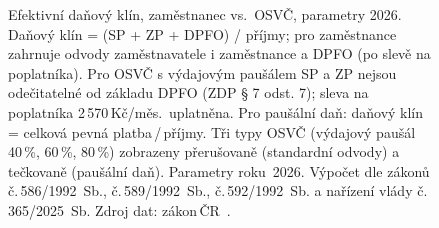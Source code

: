 \def\strProblemyDanovyKlinCzCaption{\centering Efektivní daňový klín, zaměstnanec vs.\ OSVČ, parametry 2026. Daňový klín = (SP + ZP + DPFO) / příjmy; pro zaměstnance zahrnuje odvody zaměstnavatele i zaměstnance a DPFO (po slevě na poplatníka). Pro OSVČ s výdajovým paušálem SP a ZP nejsou odečitatelné od základu DPFO (ZDP § 7 odst. 7); sleva na poplatníka 2\,570\,Kč/měs.\ uplatněna. Pro paušální daň: daňový klín = celková pevná platba\,/\,příjmy. Tři typy OSVČ (výdajový paušál 40\,\%, 60\,\%, 80\,\%) zobrazeny přerušovaně (standardní odvody) a tečkovaně (paušální daň). Parametry roku~2026. Výpočet dle zákonů č.\,586/1992~Sb., č.\,589/1992~Sb., č.\,592/1992~Sb. a nařízení vlády č.\,365/2025~Sb. Zdroj dat: zákon\,ČR~\cite{zakon_zdp_1992}\cite{zakon_sp_1992}\cite{zakon_zp_1992}\cite{nv_365_2025}.}%
%
\begin{figure}[htbp]
  \centering
  \resizebox{0.95\linewidth}{!}{}
  \caption{\strProblemyDanovyKlinCzCaption}
  \label{fig:problemy_danovy_klin_cz}
\end{figure}
